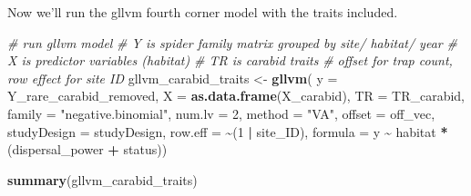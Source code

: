 \documentclass[
]{article}
\newenvironment{Shaded}{\begin{snugshade}}{\end{snugshade}}
\newcommand{\AttributeTok}[1]{\textcolor[rgb]{0.13,0.29,0.53}{#1}}
\newcommand{\CommentTok}[1]{\textcolor[rgb]{0.56,0.35,0.01}{\textit{#1}}}
\newcommand{\DecValTok}[1]{\textcolor[rgb]{0.00,0.00,0.81}{#1}}
\newcommand{\FunctionTok}[1]{\textcolor[rgb]{0.13,0.29,0.53}{\textbf{#1}}}
\newcommand{\NormalTok}[1]{#1}
\newcommand{\OtherTok}[1]{\textcolor[rgb]{0.56,0.35,0.01}{#1}}
\newcommand{\SpecialCharTok}[1]{\textcolor[rgb]{0.81,0.36,0.00}{\textbf{#1}}}
\newcommand{\StringTok}[1]{\textcolor[rgb]{0.31,0.60,0.02}{#1}}
\begin{document}
\begin{Shaded}
\end{Shaded}

Now we'll run the gllvm fourth corner model with the traits included.

\begin{Shaded}
\begin{Highlighting}[]
\CommentTok{\# run gllvm model}
\CommentTok{\# Y is spider family matrix grouped by site/ habitat/ year}
\CommentTok{\# X is predictor variables (habitat)}
\CommentTok{\# TR is carabid traits}
\CommentTok{\# offset for trap count, row effect for site ID}
\NormalTok{gllvm\_carabid\_traits }\OtherTok{\textless{}{-}} \FunctionTok{gllvm}\NormalTok{(}
  \AttributeTok{y =}\NormalTok{ Y\_rare\_carabid\_removed,}
  \AttributeTok{X =} \FunctionTok{as.data.frame}\NormalTok{(X\_carabid),}
  \AttributeTok{TR =}\NormalTok{ TR\_carabid,}
  \AttributeTok{family =} \StringTok{"negative.binomial"}\NormalTok{,}
  \AttributeTok{num.lv =} \DecValTok{2}\NormalTok{,}
  \AttributeTok{method =} \StringTok{"VA"}\NormalTok{,}
  \AttributeTok{offset =}\NormalTok{ off\_vec,}
  \AttributeTok{studyDesign =}\NormalTok{ studyDesign,}
  \AttributeTok{row.eff =} \SpecialCharTok{\textasciitilde{}}\NormalTok{(}\DecValTok{1} \SpecialCharTok{|}\NormalTok{ site\_ID),}
  \AttributeTok{formula =}\NormalTok{ y }\SpecialCharTok{\textasciitilde{}}\NormalTok{ habitat }\SpecialCharTok{*}\NormalTok{ (dispersal\_power }\SpecialCharTok{+}\NormalTok{ status))}

\FunctionTok{summary}\NormalTok{(gllvm\_carabid\_traits)}
\end{Highlighting}
\end{Shaded}
\end{document}
